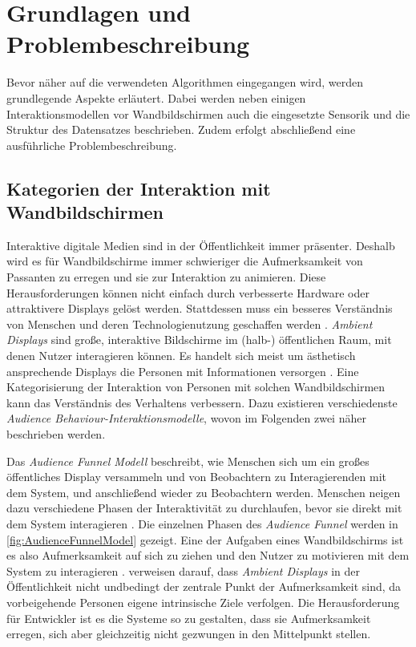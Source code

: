 \chapter{Grundlagen und Problembeschreibung}
\label{chapter2}
Bevor näher auf die verwendeten Algorithmen eingegangen wird,
werden grundlegende Aspekte erläutert.
Dabei werden neben einigen Interaktionsmodellen vor Wandbildschirmen
auch die eingesetzte Sensorik und die Struktur des Datensatzes beschrieben.
Zudem erfolgt abschließend eine ausführliche Problembeschreibung.


\section{Kategorien der Interaktion mit Wandbildschirmen}
\label{2-KategorienInteraktion-Wandbildschirme}
Interaktive digitale Medien sind in der Öffentlichkeit immer präsenter.
Deshalb wird es für Wandbildschirme immer schwieriger die Aufmerksamkeit von Passanten zu erregen
und sie zur Interaktion zu animieren.
Diese Herausforderungen können nicht einfach durch verbesserte Hardware oder attraktivere Displays gelöst werden.
Stattdessen muss ein besseres Verständnis von Menschen und deren Technologienutzung geschaffen werden \citep{wouters_uncovering_2016}.
\emph{Ambient Displays} sind große, interaktive Bildschirme im (halb-) öffentlichen Raum, mit denen Nutzer interagieren können.
Es handelt sich meist um ästhetisch ansprechende Displays die Personen mit Informationen versorgen \citep{mankoff_heuristic_2003}.
Eine Kategorisierung der Interaktion von Personen mit solchen Wandbildschirmen kann das Verständnis des Verhaltens verbessern.
Dazu existieren verschiedenste \emph{Audience Behaviour-Interaktionsmodelle}, wovon im Folgenden zwei näher beschrieben werden.

Das \emph{Audience Funnel Modell} beschreibt, wie Menschen sich um ein großes öffentliches Display versammeln
und von Beobachtern zu Interagierenden mit dem System, und anschließend wieder zu Beobachtern werden.
Menschen neigen dazu verschiedene Phasen der Interaktivität zu durchlaufen,
bevor sie direkt mit dem System interagieren \citep{wouters_uncovering_2016, mai_audience_2018}.
Die einzelnen Phasen des \emph{Audience Funnel} werden in \autoref{fig:AudienceFunnelModel} gezeigt.
Eine der Aufgaben eines Wandbildschirms ist es also Aufmerksamkeit auf sich zu ziehen
und den Nutzer zu motivieren mit dem System zu interagieren \citep{mai_audience_2018}.
\citet{mai_audience_2018} verweisen darauf, dass \emph{Ambient Displays} in der Öffentlichkeit
nicht undbedingt der zentrale Punkt der Aufmerksamkeit sind, da vorbeigehende Personen eigene intrinsische Ziele verfolgen.
Die Herausforderung für Entwickler ist es die Systeme so zu gestalten,
dass sie Aufmerksamkeit erregen, sich aber gleichzeitig nicht gezwungen in den Mittelpunkt stellen.

